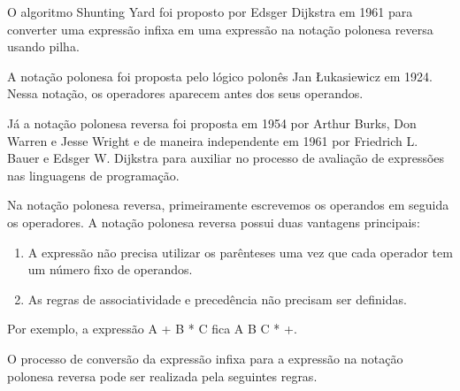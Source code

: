 O algoritmo Shunting Yard foi proposto por Edsger Dijkstra em 1961 para converter uma expressão infixa em uma expressão na notação polonesa reversa usando pilha. 

A notação polonesa foi proposta pelo lógico polonês Jan Łukasiewicz em 1924. Nessa notação, os operadores aparecem antes dos seus operandos.

Já a notação polonesa reversa foi proposta em 1954 por Arthur Burks, Don Warren e Jesse Wright e de maneira independente em 1961 por Friedrich L. Bauer e Edsger W. Dijkstra para auxiliar no processo de avaliação de expressões nas linguagens de programação.


Na notação polonesa reversa, primeiramente escrevemos os operandos em seguida os operadores. A notação polonesa reversa possui duas vantagens principais:

\begin{enumerate}
\item A expressão não precisa utilizar os parênteses uma vez que cada operador tem um número fixo de operandos.
\item As regras de associatividade e precedência não precisam ser definidas.
\end{enumerate}

Por exemplo, a expressão A + B * C fica A B C * +.

O processo de conversão da expressão infixa para a expressão na notação polonesa reversa pode ser realizada pela seguintes regras.

